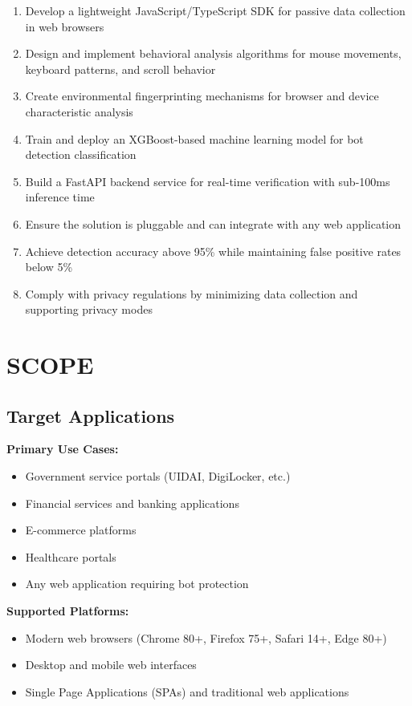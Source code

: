 \begin{enumerate}
    \item Develop a lightweight JavaScript/TypeScript SDK for passive data collection in web browsers
    \item Design and implement behavioral analysis algorithms for mouse movements, keyboard patterns, and scroll behavior
    \item Create environmental fingerprinting mechanisms for browser and device characteristic analysis
    \item Train and deploy an XGBoost-based machine learning model for bot detection classification
    \item Build a FastAPI backend service for real-time verification with sub-100ms inference time
    \item Ensure the solution is pluggable and can integrate with any web application
    \item Achieve detection accuracy above 95\% while maintaining false positive rates below 5\%
    \item Comply with privacy regulations by minimizing data collection and supporting privacy modes
\end{enumerate}

\section{SCOPE}

\subsection{Target Applications}

\textbf{Primary Use Cases:}
\begin{itemize}
    \item Government service portals (UIDAI, DigiLocker, etc.)
    \item Financial services and banking applications
    \item E-commerce platforms
    \item Healthcare portals
    \item Any web application requiring bot protection
\end{itemize}

\textbf{Supported Platforms:}
\begin{itemize}
    \item Modern web browsers (Chrome 80+, Firefox 75+, Safari 14+, Edge 80+)
    \item Desktop and mobile web interfaces
    \item Single Page Applications (SPAs) and traditional web applications
\end{itemize}

